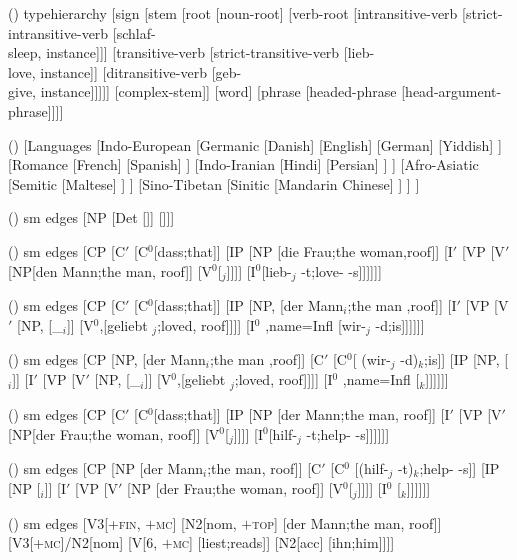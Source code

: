 \begin {forest}()
 typehierarchy [sign [stem [root [noun-root] [verb-root [intransitive-verb [strict-intransitive-verb [schlaf-\\sleep, instance]]] [transitive-verb [strict-transitive-verb [lieb-\\love, instance]] [ditransitive-verb [geb-\\give, instance]]]]] [complex-stem]] [word] [phrase [headed-phrase [head-argument-phrase]]]] \end {forest}
\begin {forest}()
 [Languages [Indo-European [Germanic [Danish] [English] [German] [Yiddish] ] [Romance [French] [Spanish] ] [Indo-Iranian [Hindi] [Persian] ] ] [Afro-Asiatic [Semitic [Maltese] ] ] [Sino-Tibetan [Sinitic [Mandarin Chinese] ] ] ] \end {forest}
\begin {forest}()
 sm edges [NP [Det [\trace ]] [\nbar [N [\trace ]]]] \end {forest}
\begin {forest}()
 sm edges [CP [C$'$ [C$^0$[dass;that]] [IP [NP [die Frau;the woman,roof]] [I$'$ [VP [V$'$ [NP[den Mann;the man, roof]] [V$^0$[\trace $_j$]]]] [I$^0$[lieb-$_j$ -t;love- -s]]]]]] \end {forest}
\begin {forest}()
 sm edges [CP [C$'$ [C$^0$[dass;that]] [IP [NP, [der Mann$_i$;the man ,roof]] [I$'$ [VP [V$'$ [NP, [\_$_i$]] [V$^0$,[geliebt \trace $_j$;loved, roof]]]] [I$^0$ ,name=Infl [wir-$_j$ -d;is]]]]]] \end {forest}
\begin {forest}()
 sm edges [CP [NP, [der Mann$_i$;the man ,roof]] [C$'$ [C$^0$[ (wir-$_j$ -d)$_k$;is]] [IP [NP, [\trace $_i$]] [I$'$ [VP [V$'$ [NP, [\_$_i$]] [V$^0$,[geliebt \trace $_j$;loved, roof]]]] [I$^0$ ,name=Infl [\trace $_k$]]]]]] \end {forest}
\begin {forest}()
 sm edges [CP [C$'$ [C$^0$[dass;that]] [IP [NP [der Mann;the man, roof]] [I$'$ [VP [V$'$ [NP[der Frau;the woman, roof]] [V$^0$[\trace $_j$]]]] [I$^0$[hilf-$_j$ -t;help- -s]]]]]] \end {forest}
\begin {forest}()
 sm edges [CP [NP [der Mann$_i$;the man, roof]] [C$'$ [C$^0$ [(hilf-$_j$ -t)$_k$;help- -s]] [IP [NP [\trace $_i$]] [I$'$ [VP [V$'$ [NP [der Frau;the woman, roof]] [V$^0$[\trace $_j$]]]] [I$^0$ [\trace $_k$]]]]]] \end {forest}
\begin {forest}()
 sm edges [{V3[+\textsc {fin}, $+$\textsc {mc}]} [{N2[nom, $+$\textsc {top}]} [der Mann;the man, roof]] [{V3[+\textsc {mc}]/N2[nom]} [{V[6, $+$\textsc {mc}]} [liest;reads]] [{N2[acc]} [ihn;him]]]] \end {forest}
